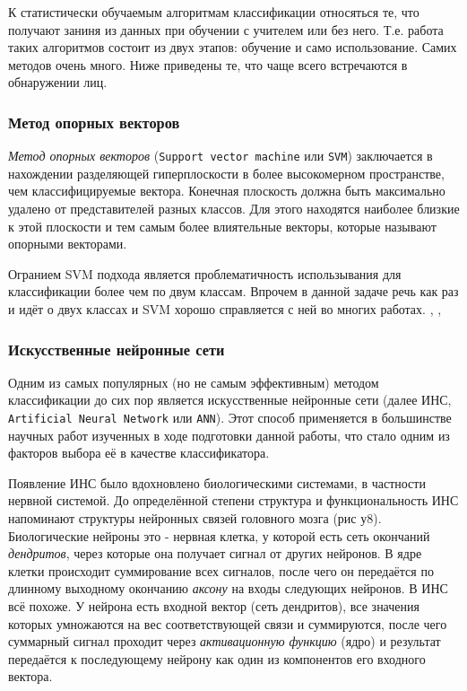 \documentclass[12pt]{report}
\begin{document}
К статистически обучаемым алгоритмам классификации относяться те, что получают заниня из данных при обучении с учителем или без него. Т.е. работа таких алгоритмов состоит из двух этапов: обучение и само использование. Самих методов очень много. Ниже приведены те, что чаще всего встречаются в обнаружении лиц. 

\subsubsection{Метод опорных векторов}
\emph{Метод опорных векторов} (\texttt{Support vector machine} или \texttt{SVM}) заключается в нахождении разделяющей гиперплоскости в более высокомерном пространстве, чем классифицируемые вектора. Конечная плоскость должна быть максимально удалено от представителей разных классов. Для этого находятся наиболее близкие к этой плоскости и тем самым более влиятельные векторы, которые называют опорными векторами. \citep{shavers2006svm}

Огранием SVM подхода является проблематичность использывания для классификации более чем по двум классам. Впрочем в данной задаче речь как раз и идёт о двух классах и SVM хорошо справляется с ней во многих работах. \citep{shavers2006svm}, \citep{jee2004eye}, \citep{saxena2008real}
\subsubsection{Искусственные нейронные сети}
Одним из самых популярных (но не самым эффективным) методом классификации до сих пор является искусственные нейронные сети (далее ИНС, \texttt{Artificial Neural Network} или \texttt{ANN}). Этот способ применяется в большинстве научных работ изученных в ходе подготовки данной работы, что стало одним из факторов выбора её в качестве классификатора. 

Появление ИНС было вдохновлено биологическими системами, в частности нервной системой. До определённой степени структура и функциональность ИНС напоминают структуры нейронных связей головного мозга (рис у8). Биологические нейроны это - нервная клетка, у которой есть сеть окончаний \emph{дендритов}, через которые она получает сигнал от других нейронов. В ядре клетки происходит суммирование всех сигналов, после чего он передаётся по длинному выходному окончанию \emph{аксону} на входы следующих нейронов. В ИНС всё похоже. У нейрона есть входной вектор (сеть дендритов), все значения которых умножаются на вес соответствующей связи и суммируются, после чего суммарный сигнал проходит через \emph{активационную функцию} (ядро) и результат передаётся к последующему нейрону как один из компонентов его входного вектора. 
\end{document}
